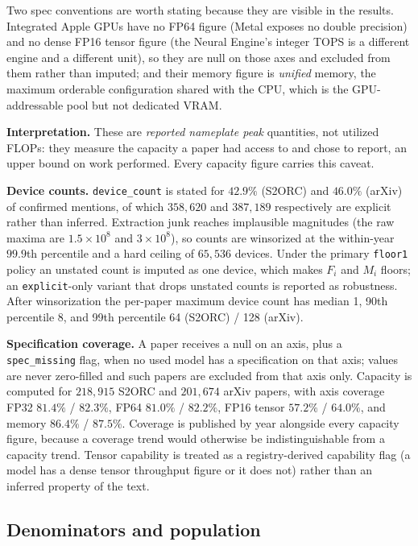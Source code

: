 Two spec conventions are worth stating because they are visible in the results.
Integrated Apple GPUs have no FP64 figure (Metal exposes no double precision) and
no dense FP16 tensor figure (the Neural Engine's integer TOPS is a different
engine and a different unit), so they are null on those axes and excluded from
them rather than imputed; and their memory figure is \emph{unified} memory, the
maximum orderable configuration shared with the CPU, which is the
GPU-addressable pool but not dedicated VRAM.

\textbf{Interpretation.} These are \emph{reported nameplate peak} quantities,
not utilized FLOPs: they measure the capacity a paper had access to and chose to
report, an upper bound on work performed. Every capacity figure carries this
caveat.

\textbf{Device counts.} \texttt{device\_count} is stated for $42.9\%$ (S2ORC)
and $46.0\%$ (arXiv) of confirmed mentions, of which $358{,}620$ and $387{,}189$
respectively are explicit rather than inferred. Extraction junk reaches
implausible magnitudes (the raw maxima are $1.5\times 10^8$ and $3\times 10^8$),
so counts are winsorized at the within-year $99.9$th percentile and a hard
ceiling of $65{,}536$ devices. Under the primary \texttt{floor1} policy an
unstated count is imputed as one device, which makes $F_i$ and $M_i$ floors;
an \texttt{explicit}-only variant that drops unstated counts is reported as
robustness. After winsorization the per-paper maximum device count has median 1,
90th percentile 8, and 99th percentile 64 (S2ORC) / 128 (arXiv).

\textbf{Specification coverage.} A paper receives a null on an axis, plus a
\texttt{spec\_missing} flag, when no used model has a specification on that axis;
values are never zero-filled and such papers are excluded from that axis only.
Capacity is computed for $218{,}915$ S2ORC and $201{,}674$ arXiv papers, with
axis coverage FP32 $81.4\%$ / $82.3\%$, FP64 $81.0\%$ / $82.2\%$, FP16 tensor
$57.2\%$ / $64.0\%$, and memory $86.4\%$ / $87.5\%$. Coverage is published by
year alongside every capacity figure, because a coverage trend would otherwise
be indistinguishable from a capacity trend. Tensor capability is treated as a
registry-derived capability flag (a model has a dense tensor throughput figure
or it does not) rather than an inferred property of the text.

\subsection{Denominators and population}

